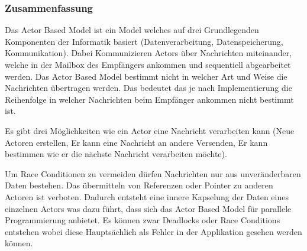 \subsubsection{Zusammenfassung}
Das Actor Based Model ist ein Model welches auf drei Grundlegenden Komponenten der Informatik basiert (Datenverarbeitung, Datenspeicherung, Kommunikation). Dabei Kommunizieren Actors über Nachrichten miteinander, welche in der Mailbox des Empfängers ankommen und sequentiell abgearbeitet werden. Das Actor Based Model bestimmt nicht in welcher Art und Weise die Nachrichten übertragen werden. Das bedeutet das je nach Implementierung die Reihenfolge in welcher Nachrichten beim Empfänger ankommen nicht bestimmt ist. 

Es gibt drei Möglichkeiten wie ein Actor eine Nachricht verarbeiten kann (Neue Actoren erstellen, Er kann eine Nachricht an andere Versenden, Er kann bestimmen wie er die nächste Nachricht verarbeiten möchte).

Um Race Conditionen zu vermeiden dürfen Nachrichten nur aus unveränderbaren Daten bestehen. Das übermitteln von Referenzen oder Pointer zu anderen Actoren ist verboten. Dadurch entsteht eine innere Kapselung der Daten eines einzelnen Actors was dazu führt, dass sich das Actor Based Model für parallele Programmierung anbietet. Es können zwar Deadlocks oder Race Conditions entstehen wobei diese Hauptsächlich als Fehler in der Applikation gesehen werden können.